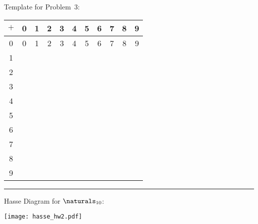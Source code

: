 \documentclass{article}
\begin{document}
\vfill
\eject

\noindent
Template for Problem~3:

\vskip 0.2in

\begin{tabular}{|c|c|c|c|c|c|c|c|c|c|c|}
\hline
$+$ & 0 & 1 & 2 & 3 & 4 & 5 & 6 & 7 & 8 & 9
\\ \hline
0   & 0 & 1 & 2 & 3 & 4 & 5 & 6 & 7 & 8 & 9
\\ \hline
1   &   &   &   &   &   &   &   &   &  &
\\ \hline
2   &   &   &   &   &   &   &   &   &   &
\\ \hline
3   &   &   &   &   &   &   &   &   &    &
\\ \hline
4   &   &   &   &   &   &   &   &   &    &
\\ \hline
5   &   &   &   &   &   &   &   &   &    &
\\ \hline
6   &   &   &   &   &   &   &   &   &    &
\\ \hline
7   &   &   &   &   &   &   &   &   &   &
\\ \hline
8   &   &   &   &   &   &   &   &   &   &
\\ \hline
9   &   &   &   &   &   &   &   &   &   &
\\ \hline
\end{tabular}

\vskip 1in
\noindent
\hrule
\vskip 1in

Hasse Diagram for $\naturals_{10}$:

\vskip 0.2in

\begin{center}
\texttt{[image: hasse\_hw2.pdf]}
\end{center}

\vfill
\end{document}
